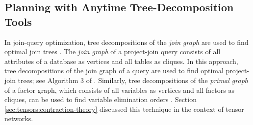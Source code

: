 \subsection{Planning with Anytime Tree-Decomposition Tools}
\label{sec_td}

In join-query optimization, tree decompositions \cite{RS91} of the \emph{join graph} are used to find optimal join trees \cite{DKV02,MPPV04}.
The \emph{join graph} of a project-join query consists of all attributes of a database as vertices and all tables as cliques.
In this approach, tree decompositions of the join graph of a query are used to find optimal project-join trees; see Algorithm 3 of \cite{MPPV04}.
Similarly, tree decompositions of the \emph{primal graph} of a factor graph, which consists of all variables as vertices and all factors as cliques, can be used to find variable elimination orders \cite{KDLD05}.
Section \ref{sec:tensors:contraction-theory} discussed this technique in the context of tensor networks.

